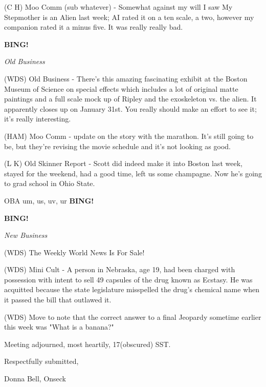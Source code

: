 \documentclass[12pt]{article}
\newcommand{\bing}{{\bf BING!} }
\newcommand{\goto}[1]{\bing \vskip 12pt \centerline{{\em{#1}}}}
\begin{document}
(C H) Moo Comm (sub whatever) - Somewhat against my will I saw My Stepmother is an Alien last week; AI rated it on a ten scale, a two, however my companion rated it a minus five. It was really really bad.

\goto{Old Business}

(WDS) Old Business - There's this amazing fascinating exhibit at the Boston Museum of Science on special effects which includes a lot of original matte paintings and a full scale mock up of Ripley and the exoskeleton vs. the alien. It apparently closes up on January 31st. You really should make an effort to see it; it's really interesting.

(HAM) Moo Comm - update on the story with the marathon. It's still going to be, but they're revising the movie schedule and it's not looking as good.

(L K) Old Skinner Report - Scott did indeed make it into Boston last week, stayed for the weekend, had a good time, left us some champagne. Now he's going to grad school in Ohio State.

OBA um, us, uv, ur \bing

\goto{New Business}

(WDS) The Weekly World News Is For Sale!

(WDS) Mini Cult - A person in Nebraska, age 19, had been charged with possession with intent to sell 49 capsules of the drug known as Ecstasy. He was acquitted because the state legislature misspelled the drug's chemical name when it passed the bill that outlawed it.

(WDS) Move to note that the correct answer to a final Jeopardy sometime earlier this week was "What is a banana?"

\vspace{12pt}

\noindent
Meeting adjourned, most heartily, 17(obscured) SST.

\vspace{18pt}

\centerline{Respectfully submitted,}
\centerline{Donna Bell, Onseck}
\end{document}
